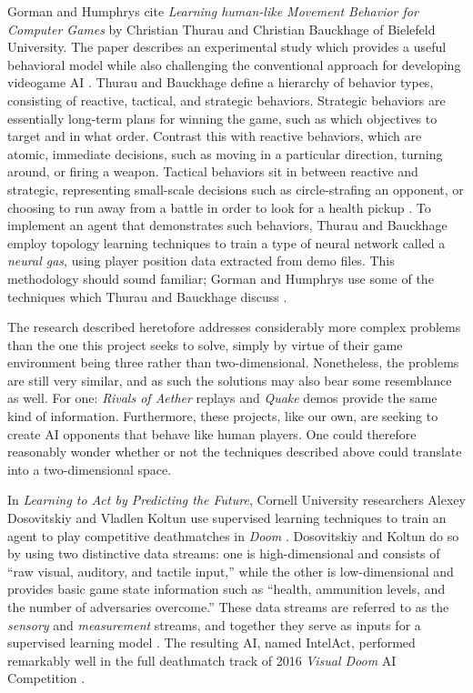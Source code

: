Gorman and Humphrys cite {\it Learning human-like Movement Behavior for Computer Games} by Christian Thurau and Christian Bauckhage of Bielefeld University. The paper describes an experimental study which provides a useful behavioral model while also challenging the conventional approach for developing videogame AI \cite{Thurau:2004}. Thurau and Bauckhage define a hierarchy of behavior types, consisting of reactive, tactical, and strategic behaviors. Strategic behaviors are essentially long-term plans for winning the game, such as which objectives to target and in what order. Contrast this with reactive behaviors, which are atomic, immediate decisions, such as moving in a particular direction, turning around, or firing a weapon. Tactical behaviors sit in between reactive and strategic, representing small-scale decisions such as circle-strafing an opponent, or choosing to run away from a battle in order to look for a health pickup \cite{Gorman:2006}. To implement an agent that demonstrates such behaviors, Thurau and Bauckhage employ topology learning techniques to train a type of neural network called a {\it neural gas}, using player position data extracted from demo files. This methodology should sound familiar; Gorman and Humphrys use some of the techniques which Thurau and Bauckhage discuss \cite{Thurau:2004}.

The research described heretofore addresses considerably more complex problems than the one this project seeks to solve, simply by virtue of their game environment being three rather than two-dimensional. Nonetheless, the problems are still very similar, and as such the solutions may also bear some resemblance as well. For one: {\it Rivals of Aether} replays and {\it Quake} demos provide the same kind of information. Furthermore, these projects, like our own, are seeking to create AI opponents that behave like human players. One could therefore reasonably wonder whether or not the techniques described above could translate into a two-dimensional space.

In {\it Learning to Act by Predicting the Future}, Cornell University researchers Alexey Dosovitskiy and Vladlen Koltun use supervised learning techniques to train an agent to play competitive deathmatches in {\it Doom} \cite{VDComp:2016}. Dosovitskiy and Koltun do so by using two distinctive data streams: one is high-dimensional and consists of ``raw visual, auditory, and tactile input,'' while the other is low-dimensional and provides basic game state information such as ``health, ammunition levels, and the number of adversaries overcome.'' These data streams are referred to as the {\it sensory} and {\it measurement} streams, and together they serve as inputs for a supervised learning model \cite{Dosovitskiy:2016}. The resulting AI, named IntelAct, performed remarkably well in the full deathmatch track of 2016 {\it Visual Doom} AI Competition \cite{VDComp:2016}.

